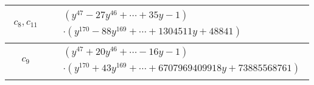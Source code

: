 \documentclass[1p]{elsarticle_modified}
\theoremstyle{definition}
\begin{document}
\begin{tabular}{m{50pt}|m{274pt}}
\hline $$\begin{aligned}c_{8},c_{11}\end{aligned}$$&$\begin{aligned}
&(y^{47}-27 y^{46}+\cdots+35 y-1)\\
&\cdot(y^{170}-88 y^{169}+\cdots+1304511 y+48841)
\end{aligned}$\\
\hline $$\begin{aligned}c_{9}\end{aligned}$$&$\begin{aligned}
&(y^{47}+20 y^{46}+\cdots-16 y-1)\\
&\cdot(y^{170}+43 y^{169}+\cdots+6707969409918 y+73885568761)
\end{aligned}$\\
\hline
\end{tabular}
\vskip 2pc
\end{document}
